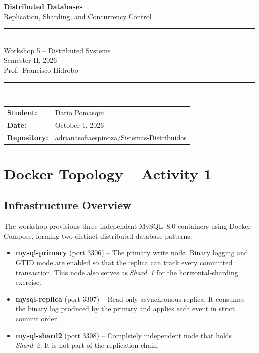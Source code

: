 \documentclass[12pt,a4paper]{article}
\begin{document}
\begin{titlepage}
  \centering
  \vspace*{1cm}
  {\Huge\bfseries\color{primaryblue} Distributed Databases\\[0.4em]}
  {\large\color{gray} Replication, Sharding, and Concurrency Control\\[2em]}
  \rule{\linewidth}{0.5pt}\\[1.5em]
  {\Large Workshop 5 -- Distributed Systems\\[0.5em]}
  {\large Semester II, 2026\\[0.5em]}
  {\large Prof.\ Francisco Hidrobo\\[2em]}
  \rule{\linewidth}{0.5pt}\\[2em]
  \begin{tabular}{ll}
    \textbf{Student:} & Dario Pomasqui \\[1.5em]
    \textbf{Date:} & October 1, 2026 \\
    \textbf{Repository:} & \href{https://github.com/adrianasofiaespinoza/Sistemas-Distribuidos/tree/main/Workshop5}{adrianasofiaespinoza/Sistemas-Distribuidos} \\
  \end{tabular}
\end{titlepage}


\section{Docker Topology -- Activity 1}

\subsection{Infrastructure Overview}

The workshop provisions three independent MySQL~8.0 containers using Docker
Compose, forming two distinct distributed-database patterns:

\begin{itemize}[leftmargin=1.5cm]
  \item \textbf{mysql-primary} (port 3306) -- The primary write node.
        Binary logging and GTID mode are enabled so that the replica can track
        every committed transaction. This node also serves as \emph{Shard~1}
        for the horizontal-sharding exercise.
  \item \textbf{mysql-replica} (port 3307) -- Read-only asynchronous replica.
        It consumes the binary log produced by the primary and applies each
        event in strict commit order.
  \item \textbf{mysql-shard2} (port 3308) -- Completely independent node that
        holds \emph{Shard~2}. It is not part of the replication chain.
\end{itemize}
\end{document}
